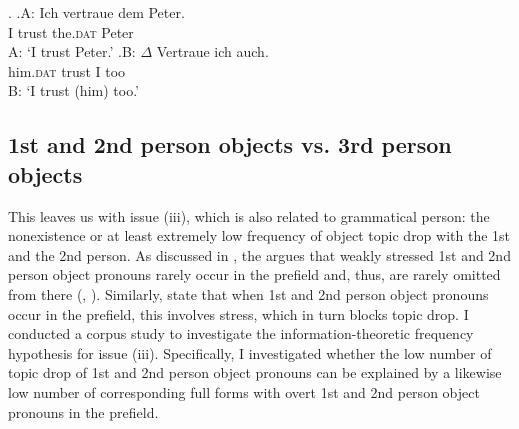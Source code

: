 \ex.\label{ex:trutkowski.exp.2.rep}
\ag.A: Ich vertraue dem Peter.\\
{} I trust the.\textsc{dat} Peter\\
A: `I trust Peter.'
\bg.\label{ex:trutkowski.exp.2.rep.b}B: $\Delta$ Vertraue ich auch.\\
{} him.\textsc{dat} trust I too\\
B: `I trust (him) too.'  \citep[3, adapted]{trutkowski2018}

\subsection{1st and 2nd person objects vs. 3rd person objects}
This leaves us with issue (iii), which is also related to grammatical person: the nonexistence or at least extremely low frequency of object topic drop with the 1st and the 2nd person.
As discussed in , the \citet{duden2016, duden2022} argues that weakly stressed 1st and 2nd person object pronouns rarely occur in the prefield and, thus, are rarely omitted from there (\cite[§1378]{duden2016}, \cite[§35]{duden2022}).
Similarly, \citet[219]{volodina.onea2012} state that when 1st and 2nd person object pronouns occur in the prefield, this involves stress, which in turn blocks topic drop.
I conducted a corpus  study to investigate the information-theoretic frequency hypothesis for issue (iii).
Specifically, I investigated whether the low number of topic drop of 1st and 2nd person object pronouns can be explained by a likewise low number of corresponding full forms with overt 1st and 2nd person object pronouns in the prefield.

